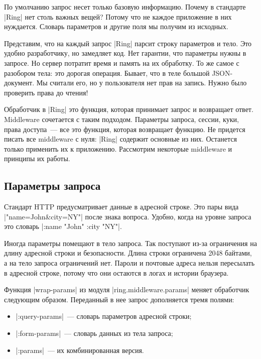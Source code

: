 По умолчанию запрос несет только базовую информацию. Почему в стандарте
\spverb|Ring| нет столь важных вещей? Потому что не каждое приложение в них
нуждается. Словарь параметров и другие поля мы получим из исходных.

Представим, что на каждый запрос \spverb|Ring| парсит строку параметров и
тело. Это удобно разработчику, но замедляет код. Нет гарантии, что параметры
нужны в запросе. Но сервер потратит время и память на их обработку. То же самое
с разобором тела: это дорогая операция. Бывает, что в теле большой JSON-документ.
Мы считали его, но у пользователя нет прав на запись. Нужно было проверить
права до чтения!

Обработчик в \spverb|Ring| это функция, которая принимает запрос и возвращает
ответ. Middleware сочетается с таким подходом. Параметры запроса, сессии, куки,
права доступа~--- все это функция, которая возвращает функцию. Не придется
писать все middleware с нуля: \spverb|Ring| содержит основные из них. Останется
только применить их к приложению. Рассмотрим некоторые middleware и принципы их
работы.

\subsection{Параметры запроса}

Стандарт HTTP предусматривает данные в адресной строке. Это пары вида
\spverb|"name=John&city=NY"| после знака вопроса. Удобно, когда на уровне
запроса это словарь \spverb|{:name "John" :city "NY"}|.

Иногда параметры помещают в тело запроса. Так поступают из-за ограничения на
длину адресной строки и безопасности. Длина строки ограничена 2048 байтами, а на
тело запроса ограничений нет. Пароли и почтовые адреса нельзя пересылать в
адресной строке, потому что они остаются в логах и истории браузера.

Функция \spverb|wrap-params| из модуля \spverb|ring.middleware.params| меняет
обработчик следующим образом. Переданный в нее запрос дополняется тремя полями:

\begin{itemize}

\item
  \spverb|:query-params|~--- словарь параметров адресной строки;

\item
  \spverb|:form-params|~--- словарь данных из тела запроса;

\item
  \spverb|:params|~--- их комбинированная версия.

\end{itemize}


